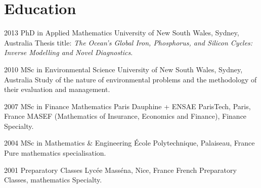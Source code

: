 
\section{Education}
\begin{entrylist}
  \entry
    {2013}
    {PhD in Applied Mathematics}
    {University of New South Wales, Sydney, Australia}
    {Thesis title: \emph{The Ocean's Global Iron, Phosphorus, and Silicon Cycles: Inverse Modelling and Novel Diagnostics}.\\
    }

  \entry
    {2010}
    {MSc in Environmental Science}
    {University of New South Wales, Sydney, Australia}
    {Study of the nature of environmental problems and the methodology of their evaluation and management.
    }

  \entry
    {2007}
    {MSc in Finance Mathematics}
    {Paris Dauphine + ENSAE ParisTech, Paris, France}
    {MASEF (Mathematics of Insurance, Economics and Finance), Finance Specialty.}

  \entry
    {2004}
    {MSc in Mathematics \& Engineering}
    {\'{E}cole Polytechnique, Palaiseau, France}
    {Pure mathematics specialisation.}

  \entry
    {2001}
    {Preparatory Classes}
    {Lyc\'{e}e Mass\'{e}na, Nice, France}
    {French Preparatory Classes, mathematics Specialty.}
\end{entrylist}




